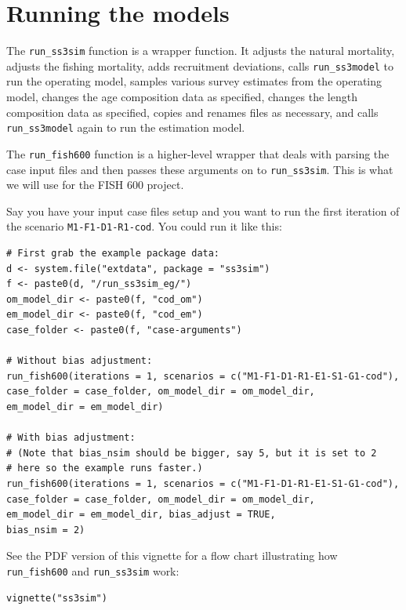 \documentclass[12pt]{article}
\begin{document}
\section{Running the models}

The \texttt{run\_ss3sim} function is a wrapper function. It adjusts the natural 
mortality, adjusts the fishing mortality, adds recruitment deviations, calls 
\texttt{run\_ss3model} to run the operating model, samples various survey 
estimates from the operating model, changes the age composition data as 
specified, changes the length composition data as specified, copies and renames 
files as necessary, and calls \texttt{run\_ss3model} again to run the 
estimation model.

The \texttt{run\_fish600} function is a higher-level wrapper that deals with 
parsing the case input files and then passes these arguments on to 
\texttt{run\_ss3sim}. This is what we will use for the FISH 600 project.

Say you have your input case files setup and you want to run the first 
iteration of the scenario \texttt{M1-F1-D1-R1-cod}. You could run it like this:

\begin{verbatim}
# First grab the example package data:
d <- system.file("extdata", package = "ss3sim")
f <- paste0(d, "/run_ss3sim_eg/")
om_model_dir <- paste0(f, "cod_om")
em_model_dir <- paste0(f, "cod_em")
case_folder <- paste0(f, "case-arguments")

# Without bias adjustment:
run_fish600(iterations = 1, scenarios = c("M1-F1-D1-R1-E1-S1-G1-cod"),
case_folder = case_folder, om_model_dir = om_model_dir,
em_model_dir = em_model_dir)

# With bias adjustment:
# (Note that bias_nsim should be bigger, say 5, but it is set to 2
# here so the example runs faster.)
run_fish600(iterations = 1, scenarios = c("M1-F1-D1-R1-E1-S1-G1-cod"),
case_folder = case_folder, om_model_dir = om_model_dir,
em_model_dir = em_model_dir, bias_adjust = TRUE,
bias_nsim = 2)
\end{verbatim}

See the PDF version of this vignette for a flow chart illustrating how 
\texttt{run\_fish600} and \texttt{run\_ss3sim} work:

\begin{verbatim}
vignette("ss3sim")
\end{verbatim}
\end{document}
